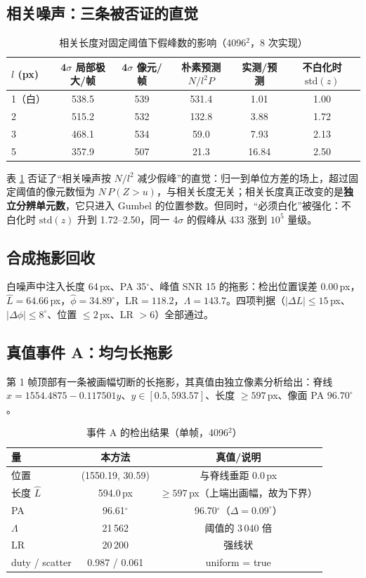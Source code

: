 \documentclass[11pt,a4paper]{ctexart}
\newcommand{\Lam}{\ensuremath{\Lambda}}
\begin{document}
\subsection{相关噪声：三条被否证的直觉}\label{sec:noise}
\begin{table}[htbp]\centering\small
\caption{相关长度对固定阈值下假峰数的影响（4096$^2$，8 次实现）}\label{tab:noise}
\begin{tabular}{@{}lccccc@{}}
\toprule
$l$ (px) & 4$\sigma$ 局部极大/帧 & 4$\sigma$ 像元/帧 & 朴素预测 $N/l^2P$ & 实测/预测 & 不白化时 $\mathrm{std}(z)$\\
\midrule
1（白） & 538.5 & 539 & 531.4 & 1.01 & 1.00\\
2 & 515.2 & 532 & 132.8 & 3.88 & 1.72\\
3 & 468.1 & 534 & 59.0 & 7.93 & 2.13\\
5 & 357.9 & 507 & 21.3 & 16.84 & 2.50\\
\bottomrule
\end{tabular}
\end{table}
表 \ref{tab:noise} 否证了“相关噪声按 $N/l^2$ 减少假峰”的直觉：归一到单位方差的场上，超过固定阈值的像元数恒为 $N\,P(Z>u)$，与相关长度无关；相关长度真正改变的是\textbf{独立分辨单元数}，它只进入 Gumbel 的位置参数。但同时，“必须白化”被强化：不白化时 $\mathrm{std}(z)$ 升到 1.72--2.50，同一 4$\sigma$ 的假峰从 433 涨到 $10^5$ 量级。

\subsection{合成拖影回收}
白噪声中注入长度 64\,px、PA 35$^\circ$、峰值 SNR 15 的拖影：检出位置误差 0.00\,px，$\hat L=64.66$\,px，$\hat\phi=34.89^\circ$，$\mathrm{LR}=118.2$，$\Lam=143.7$。四项判据（$|\Delta L|\le15$\,px、$|\Delta\phi|\le8^\circ$、位置 $\le2$\,px、LR $>6$）全部通过。

\subsection{真值事件 A：均匀长拖影}
第 1 帧顶部有一条被画幅切断的长拖影，其真值由独立像素分析给出：脊线 $x=1554.4875-0.117501y$、$y\in[0.5,593.57]$、长度 $\ge597$\,px、像面 PA $96.70^\circ$。

\begin{table}[htbp]\centering\small
\caption{事件 A 的检出结果（单帧，4096$^2$）}\label{tab:A}
\begin{tabular}{@{}lcc@{}}
\toprule
量 & 本方法 & 真值/说明\\
\midrule
位置 & (1550.19, 30.59) & 与脊线垂距 0.0\,px\\
长度 $\hat L$ & 594.0\,px & $\ge597$\,px（上端出画幅，故为下界）\\
PA & 96.61$^\circ$ & 96.70$^\circ$（$\Delta=0.09^\circ$）\\
$\Lam$ & 21\,562 & 阈值的 3\,040 倍\\
$\mathrm{LR}$ & 20\,200 & 强线状\\
duty / scatter & 0.987 / 0.061 & uniform = true\\
\bottomrule
\end{tabular}
\end{table}
\end{document}
